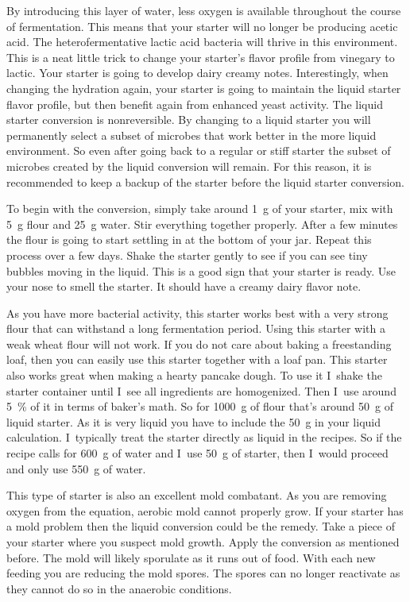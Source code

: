 By introducing this layer of water, less oxygen is available throughout the
course of fermentation. This means that your starter will no longer be
producing acetic acid. The heterofermentative lactic acid bacteria will thrive
in this environment. This is a neat little trick to change your starter's
flavor profile from vinegary to lactic. Your starter is going to develop
dairy creamy notes. Interestingly, when changing the hydration again, your starter
is going to maintain the liquid starter flavor profile, but then benefit again
from enhanced yeast activity. The liquid starter conversion is nonreversible.
By changing to a liquid starter you will permanently select a subset of
microbes that work better in the more liquid environment. So even after going back to a regular
or stiff starter the subset of microbes created by the liquid conversion
will remain. For this reason, it is recommended to keep a backup of the starter
before the liquid starter conversion.

To begin with the
conversion, simply take around \qty{1}{\gram} of your starter, mix with \qty{5}{\gram} flour and
\qty{25}{\gram} water. Stir everything together properly. After a few minutes the flour is
going to start settling in at the bottom of your jar. Repeat this process over
a few days. Shake the starter gently to see if you can see tiny  bubbles
moving in the liquid. This is a good sign that your starter is ready. Use your
nose to smell the starter. It should have a creamy dairy flavor note.

As you have more bacterial activity, this starter works best with a very strong
flour that can withstand a long fermentation period. Using this starter with a
weak wheat flour will not work. If you do not care about baking a freestanding loaf,
then you can easily use this starter together with a loaf pan.
This starter also works great when making a hearty pancake dough. To use it
I~shake the starter container until I~see all ingredients are homogenized.  Then
I~use around \qty{5}{\percent} of it in terms of baker's math. So for \qty{1000}{\gram} of flour
that's around \qty{50}{\gram} of liquid starter. As it is very liquid you have to
include the \qty{50}{\gram} in your liquid calculation. I~typically treat the starter
directly as liquid in the recipes. So if the recipe calls for \qty{600}{\gram} of water
and I~use \qty{50}{\gram} of starter, then I~would proceed and only use \qty{550}{\gram} of
water.

This type of starter is also an excellent mold combatant. As you are removing
oxygen from the equation, aerobic mold cannot properly grow. If your starter
has a mold problem then the liquid conversion could be the remedy. Take a
piece of your starter where you suspect mold growth. Apply the conversion
as mentioned before. The mold will likely sporulate as it runs out of food.
With each new feeding you are reducing the mold spores. The spores can no
longer reactivate as they cannot do so in the anaerobic conditions.

